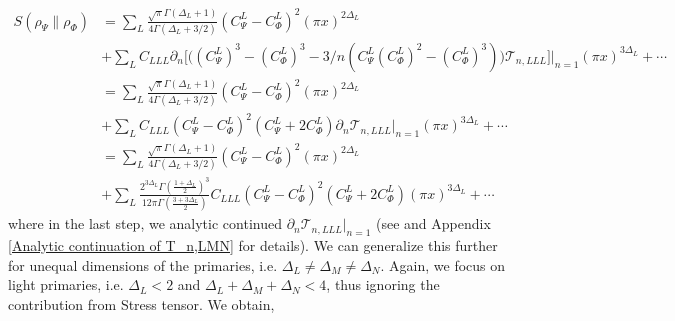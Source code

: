 \documentclass[11pt]{article}
\newcommand{\p}{\partial}
\newcommand{\nn}{\nonumber}
\newcommand{\lb}{\left(}
\newcommand{\rb}{\right)}
\begin{document}
\begin{align}
    S(\rho_\Psi \| \rho_\Phi) &=\sum_L \frac{\sqrt{\pi}\Gamma(\Delta_L+1)}{4\Gamma(\Delta_L+3/2)}(C^L_{\Psi}-C^L_{\Phi})^2 (\pi x)^{2\Delta_L} \nn \\
    & + \sum_LC_{LLL}\p_n \Big[ \Big( (C^L_{\Psi})^3 -(C^L_{\Phi})^3 - 3/n\lb C^L_{\Psi} (C^L_{\Phi})^2 - (C^L_{\Phi})^3\rb \Big)\mathcal{T}_{n,LLL} \Big]\Bigg|_{n=1}(\pi x)^{3\Delta_L} +\cdots  \\
     &= \sum_L\frac{\sqrt{\pi}\Gamma(\Delta_L+1)}{4\Gamma(\Delta_L+3/2)}(C^L_{\Psi}-C^L_{\Phi})^2 (\pi x)^{2\Delta_L} \nn \\
     & + \sum_L C_{LLL}(C^L_{\Psi} - C^L_{\Phi})^2 (C^L_{\Psi} + 2C^L_{\Phi}) \p_n \mathcal{T}_{n,LLL}|_{n=1} (\pi x)^{3\Delta_L} + \cdots \\
     &= \sum_L\frac{\sqrt{\pi}\Gamma(\Delta_L+1)}{4\Gamma(\Delta_L+3/2)}(C^L_{\Psi}-C^L_{\Phi})^2 (\pi x)^{2\Delta_L} \nn \\
     & + \sum_L \frac{2^{3\Delta_L}\Gamma \lb\frac{1+\Delta_L}{2}\rb^3}{12\pi \Gamma\lb\frac{3+3\Delta_L}{2}\rb}C_{LLL}(C^L_{\Psi} - C^L_{\Phi})^2 (C^L_{\Psi} + 2C^L_{\Phi})  (\pi x)^{3\Delta_L} + \cdots
\end{align} 
where in the last step, we analytic continued $\p_n\mathcal{T}_{n,LLL}|_{n=1}$ (see \cite{S_rosi_2018} and Appendix \ref{Analytic continuation of T_n,LMN} for details). 
We can generalize this further for unequal dimensions of the primaries, i.e. $\Delta_L \neq \Delta_M \neq \Delta_N$. Again, we focus on light primaries, i.e. $\Delta_L<2$ and $\Delta_L+ \Delta_M+\Delta_N<4$, thus ignoring the contribution from Stress tensor. We obtain,  
\end{document}
